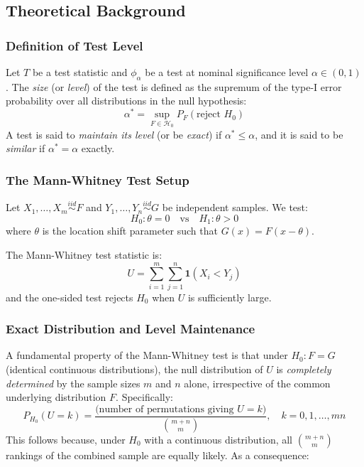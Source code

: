 \documentclass[10pt]{article}
\begin{document}
\subsection{Theoretical Background}

\subsubsection{Definition of Test Level}

Let $T$ be a test statistic and $\phi_\alpha$ be a test at nominal significance level $\alpha \in (0,1)$. The \textit{size} (or \textit{level}) of the test is defined as the supremum of the type-I error probability over all distributions in the null hypothesis:
\[
\alpha^* = \sup_{F \in \mathcal{H}_0} P_F\!\left(\text{reject } H_0\right)
\]
A test is said to \textit{maintain its level} (or be \textit{exact}) if $\alpha^* \leq \alpha$, and it is said to be \textit{similar} if $\alpha^* = \alpha$ exactly.

\subsubsection{The Mann-Whitney Test Setup}

Let $X_1, \ldots, X_m \overset{iid}{\sim} F$ and $Y_1, \ldots, Y_n \overset{iid}{\sim} G$ be independent samples. We test:
\[
H_0: \theta = 0 \quad \text{vs} \quad H_1: \theta > 0
\]
where $\theta$ is the location shift parameter such that $G(x) = F(x - \theta)$.

The Mann-Whitney test statistic is:
\[
U = \sum_{i=1}^{m}\sum_{j=1}^{n} \mathbf{1}(X_i < Y_j)
\]
and the one-sided test rejects $H_0$ when $U$ is sufficiently large.

\subsubsection{Exact Distribution and Level Maintenance}

A fundamental property of the Mann-Whitney test is that under $H_0: F = G$ (identical continuous distributions), the null distribution of $U$ is \textit{completely determined} by the sample sizes $m$ and $n$ alone, irrespective of the common underlying distribution $F$. Specifically:
\[
P_{H_0}(U = k) = \frac{\text{(number of permutations giving } U = k\text{)}}{\binom{m+n}{m}}, \quad k = 0, 1, \ldots, mn
\]
This follows because, under $H_0$ with a continuous distribution, all $\binom{m+n}{m}$ rankings of the combined sample are equally likely. As a consequence:
\end{document}
